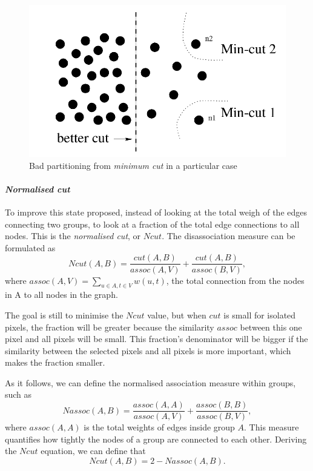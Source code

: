 \begin{figure}[!htbp]
 \centering
  \includegraphics[width=\textwidth]{img/mincutproblem.png}
 \caption{Bad partitioning from \textit{minimum cut} in a particular case \cite{shi_normalized_2000}}
\end{figure}

\paragraph{\textit{Normalised cut}}
To improve this state \cite{shi_normalized_2000} proposed, instead of looking at the total weigh of the edges connecting two groups, to look at a fraction of the total edge connections to all nodes.
This is the \textit{normalised cut}, or \(Ncut\).
The disassociation measure can be formulated as
\[Ncut(A, B) = \frac{cut(A, B)}{assoc(A, V)} + \frac{cut(A, B)}{assoc(B, V)},\]
where \(assoc(A, V) = \sum_{u\in A, t\in V} w(u, t)\), the total connection from the nodes in A to all nodes in the graph.

The goal is still to minimise the \(Ncut\) value, but when \(cut\) is small for isolated pixels, the fraction will be greater because the similarity \(assoc\) between this one pixel and all pixels will be small.
This fraction's denominator will be bigger if the similarity between the selected pixels and all pixels is more important, which makes the fraction smaller.

As it follows, we can define the normalised association measure within groups, such as
\[Nassoc(A, B) = \frac{assoc(A, A)}{assoc(A,V)} + \frac{assoc(B, B)}{assoc(B, V)},\]
where \(assoc(A, A)\) is the total weights of edges inside group \(A\).
This measure quantifies how tightly the nodes of a group are connected to each other.
Deriving the \(Ncut\) equation, we can define that
\[Ncut(A, B) = 2 - Nassoc(A, B).\]

